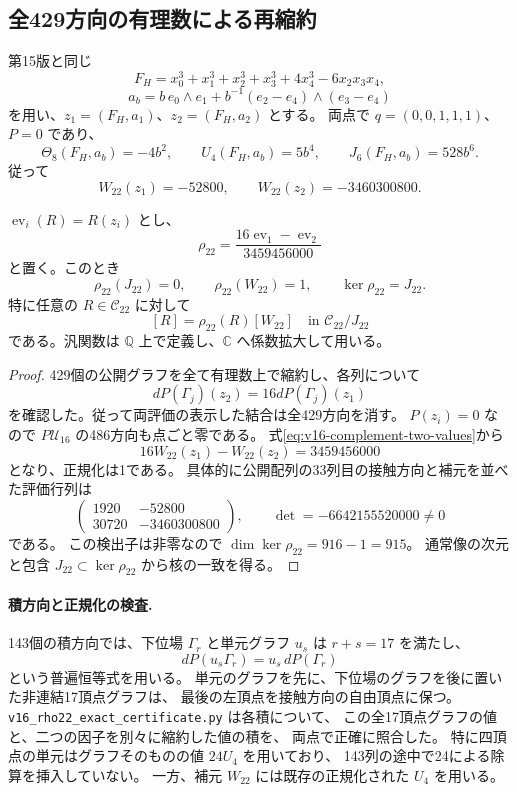 \subsection{全429方向の有理数による再縮約}

第15版と同じ
\[
 F_H=x_0^3+x_1^3+x_2^3+x_3^3+4x_4^3-6x_2x_3x_4,
\]
\[
 a_b=b\,e_0\wedge e_1+b^{-1}(e_2-e_4)\wedge(e_3-e_4)
\]
を用い、$z_1=(F_H,a_1)$、$z_2=(F_H,a_2)$ とする。
両点で $q=(0,0,1,1,1)$、$P=0$ であり、
\[
 \Theta_8(F_H,a_b)=-4b^2,\qquad
 U_4(F_H,a_b)=5b^4,\qquad J_6(F_H,a_b)=528b^6.
\]
従って
\begin{equation}\label{eq:v16-complement-two-values}
 W_{22}(z_1)=-52800,\qquad
 W_{22}(z_2)=-3460300800.
\end{equation}

\begin{proposition}[二十二次の厳密な係数汎関数]
\label{prop:v16-exact-rho22}
$\operatorname{ev}_i(R)=R(z_i)$ とし、
\begin{equation}\label{eq:v16-exact-rho22}
 \boxed{\displaystyle
 \rho_{22}=
 \frac{16\operatorname{ev}_1-\operatorname{ev}_2}{3459456000}}
\end{equation}
と置く。このとき
\[
 \rho_{22}(J_{22})=0,\qquad
 \rho_{22}(W_{22})=1,\qquad
                       \ker\rho_{22}=J_{22}.
\]
特に任意の $R\in\mathcal C_{22}$ に対して
\[
 [R]=\rho_{22}(R)[W_{22}]
                        \quad\text{in }\mathcal C_{22}/J_{22}
\]
である。汎関数は $\mathbb Q$ 上で定義し、$\mathbb C$ へ係数拡大して用いる。
\end{proposition}

\begin{proof}
429個の公開グラフを全て有理数上で縮約し、各列について
\[
                      dP(\Gamma_j)(z_2)=16dP(\Gamma_j)(z_1)
\]
を確認した。従って両評価の表示した結合は全429方向を消す。
$P(z_i)=0$ なので $P\mathcal U_{16}$ の486方向も点ごと零である。
式\eqref{eq:v16-complement-two-values}から
\[
 16W_{22}(z_1)-W_{22}(z_2)=3459456000
\]
となり、正規化は1である。
具体的に公開配列の33列目の接触方向と補元を並べた評価行列は
\[
 \begin{pmatrix}
 1920&-52800\\
 30720&-3460300800
 \end{pmatrix},\qquad
 \det=-6642155520000\ne0
\]
である。
この検出子は非零なので $\dim\ker\rho_{22}=916-1=915$。
通常像の次元と包含 $J_{22}\subset\ker\rho_{22}$ から核の一致を得る。
\end{proof}

\paragraph{積方向と正規化の検査.}
143個の積方向では、下位場 $\Gamma_r$ と単元グラフ $u_s$ は $r+s=17$ を満たし、
\[
 dP(u_s\Gamma_r)=u_s\,dP(\Gamma_r)
\]
という普遍恒等式を用いる。
単元のグラフを先に、下位場のグラフを後に置いた非連結17頂点グラフは、
最後の左頂点を接触方向の自由頂点に保つ。
\nolinkurl{v16_rho22_exact_certificate.py} は各積について、
この全17頂点グラフの値と、二つの因子を別々に縮約した値の積を、
両点で正確に照合した。
特に四頂点の単元はグラフそのものの値 $24U_4$ を用いており、
143列の途中で24による除算を挿入していない。
一方、補元 $W_{22}$ には既存の正規化された $U_4$ を用いる。

